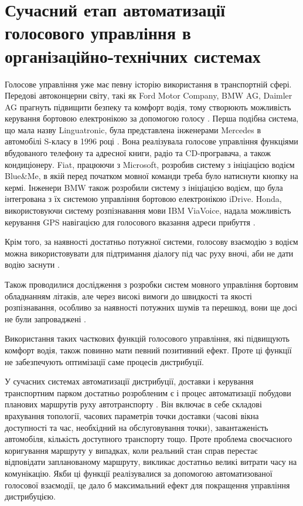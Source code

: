 \section{Сучасний етап автоматизації голосового управління в організаційно-технічних системах} \label{sect1_2}

Голосове управління уже має певну історію використання в транспортній сфері. Передові автоконцерни світу, такі як Ford Motor Company, BMW AG, Daimler AG прагнуть підвищити безпеку та комфорт водія, тому створюють можливість керування бортовою електронікою за допомогою голосу \cite{Kravchenko_2009}. Перша подібна система, що мала назву Linguatronic, була представлена інженерами Mercedes в автомобілі S-класу в 1996 році \cite{Heisterkamp_2001}. Вона реалізувала голосове управління функціями вбудованого телефону та адресної книги, радіо та CD-програвача, а також кондиціонеру. Fiat, працюючи з Microsoft, розробив систему з ініціацією водієм Blue\&Me, в якій перед початком мовної команди треба було натиснути кнопку на кермі. Інженери BMW також розробили систему з ініціацією водієм, що була інтегрована з їх системою управління бортовою електронікою iDrive. Honda, використовуючи систему розпізнавання мови IBM ViaVoice, надала можливість керування GPS навігацією для голосового вказання адреси прибуття \cite{Jonsson_2009}.

Крім того, за наявності достатньо потужної системи, голосову взаємодію з водієм можна використовувати для підтримання діалогу під час руху вночі, аби не дати водію заснути \cite{Kravchenko_2012}.

Також проводилися дослідження з розробки систем мовного управління бортовим обладнанням літаків, але через високі вимоги до швидкості та якості розпізнавання, особливо за наявності потужних шумів та перешкод, вони ще досі не були запроваджені \cite{Korsun_2013}.

Використання таких часткових функцій голосового управління, які підвищують комфорт водія, також повинно мати певний позитивний ефект. Проте ці функції не забезпечують оптимізації саме процесів дистрибуції.

У сучасних системах автоматизації дистрибуції, доставки і керування транспортним парком достатньо розробленим є і процес автоматизації побудови планових маршрутів руху автотранспорту \cite{art1}. Він включає в себе складові врахування топології, часових параметрів точки доставки (часові вікна доступності та час, необхідний на обслуговування точки), завантаженість автомобіля, кількість доступного транспорту тощо. Проте проблема своєчасного коригування маршруту у випадках, коли реальний стан справ перестає відповідати запланованому маршруту, викликає достатньо великі витрати часу на комунікацію. Якби ці функції реалізувалися за допомогою автоматизованої голосової взаємодії, це дало б максимальний ефект для покращення управління дистрибуцією.

